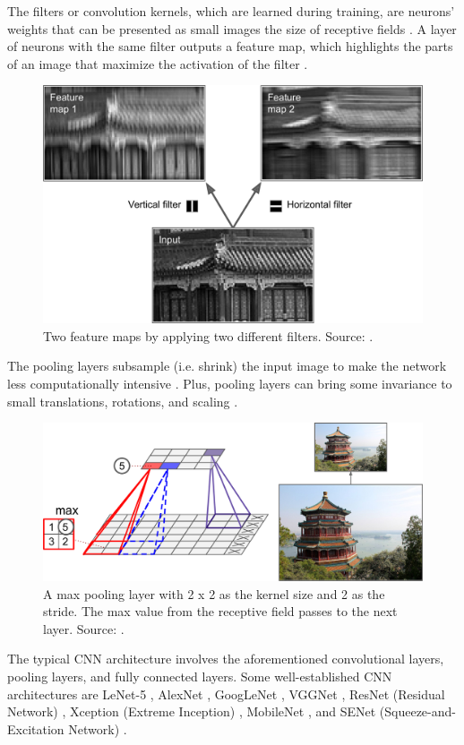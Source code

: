 \documentclass[a4paper, 11pt, oneside]{article}
\begin{document}
The filters or convolution kernels, which are learned during training, are neurons' weights that can be presented as
small images the size of receptive fields \cite{geron2019hands}. A layer of neurons with the same filter outputs a
feature map, which highlights the parts of an image that maximize the activation of the filter \cite{geron2019hands}.

\begin{figure}[ht]
  \begin{center}
    \includegraphics[width=.6\textwidth]{filters.png}
  \end{center}
  \caption{Two feature maps by applying two different filters. Source: \cite{geron2019hands}.}
\end{figure}

The pooling layers subsample (i.e. shrink) the input image to make the network less computationally intensive
\cite{geron2019hands}. Plus, pooling layers can bring some invariance to small translations, rotations, and scaling
\cite{geron2019hands}.

\begin{figure}[ht]
  \begin{center}
    \includegraphics[width=.5\textwidth]{max_pooling.png}
  \end{center}
  \caption{A max pooling layer with 2 x 2 as the kernel size and 2 as the stride. The max value from the receptive
  field passes to the next layer. Source: \cite{geron2019hands}.}
\end{figure}

The typical CNN architecture involves the aforementioned convolutional layers, pooling layers, and fully connected layers.
Some well-established CNN architectures are LeNet-5 \cite{lecun1998gradient}, AlexNet \cite{krizhevsky2012imagenet},
GoogLeNet \cite{szegedy2015going}, VGGNet \cite{simonyan2014very}, ResNet (Residual Network) \cite{he2016deep}, Xception
(Extreme Inception) \cite{chollet2017xception}, MobileNet \cite{howard2017mobilenets, sandler2018mobilenetv2},
and SENet (Squeeze-and-Excitation Network) \cite{hu2018squeeze}.
\end{document}
